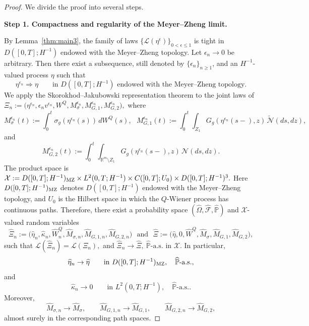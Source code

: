 \documentclass[11pt]{article}
\theoremstyle{plain}
\numberwithin{equation}{section}
\begin{document}
 
\begin{proof}
We divide the proof into several steps.



\medskip
\noindent\textbf{Step 1. Compactness and regularity of the Meyer--Zheng limit.}

By Lemma~\ref{thm:main3}, the family of laws \(\{\mathcal L(\eta^\epsilon)\}_{0<\epsilon\le1}\)
is tight in \(D([0,T];H^{-1})\) endowed with the Meyer--Zheng topology. Let \(\epsilon_n\to0\) be arbitrary. Then there exist a subsequence, still
denoted by \(\{\epsilon_n\}_{n\ge1}\), and an \(H^{-1}\)-valued process \(\eta\) such that
\[
\eta^{\epsilon_n}\Longrightarrow \eta\qquad \text{in }D([0,T];H^{-1})\text{ endowed with the Meyer--Zheng topology}.
\]
We apply the Skorokhod--Jakubowski representation theorem to the joint laws
of
\(\Xi_n:=\Big(\eta^{\epsilon_n},\epsilon_n v^{\epsilon_n},W^Q, M_{\sigma}^{\epsilon_n}, M_{G,1}^{\epsilon_n}, M_{G,2}^{\epsilon_n} \Big),\)
where
\[
M_{\sigma}^{\epsilon_n}(t) :=
\int_0^t \sigma_g(\eta^{\epsilon_n}(s))\,dW^Q(s),~~~M_{G,1}^{\epsilon_n}(t):=\int_0^t\int_{Z_1}G_g(\eta^{\epsilon_n}(s-),z)\,\tilde{\mathcal N}(ds,dz),
\]
and
\[
M_{G,2}^{\epsilon_n}(t):=\int_0^t\int_{\mathbb R^m\setminus Z_1}G_g(\eta^{\epsilon_n}(s-),z)\,{\mathcal N}(ds,dz).
\]
The product space is \(\mathcal X:=D([0,T];H^{-1})_{\rm MZ}\times L^2(0,T;H^{-1})\times C([0,T];U_0)\times D([0,T];H^{-1})^3 .\)
Here \(D([0,T];H^{-1})_{\rm MZ}\) denotes \(D([0,T];H^{-1})\) endowed with the Meyer--Zheng topology, and \(U_0\)
is the Hilbert space in which the \(Q\)-Wiener process has continuous paths.
Therefore, there exist a probability space \((\widehat\Omega,\widehat{\mathcal F},\widehat{\mathbb P})\)
and \(\mathcal X\)-valued random variables
\[
\widehat\Xi_n := \Big(\widehat\eta_n,\widehat\kappa_n,\widehat W_n^Q,\widehat M_{\sigma,n},\widehat M_{G,1,n},\widehat M_{G,2,n}\Big)
~~~\text{and}~~~\widehat\Xi:=\Big(\widehat\eta,0,\widehat W^Q,\widehat M_{\sigma},\widehat M_{G,1},\widehat M_{G,2}\Big),
\]
such that \(\mathcal L(\widehat\Xi_n)=\mathcal L(\Xi_n),\) and \(\widehat\Xi_n\to\widehat\Xi,~\widehat{\mathbb P}\text{-a.s. in }\mathcal X .\)
In particular,
\[
\widehat\eta_n\to\widehat\eta\qquad\text{in }D([0,T];H^{-1})_{\rm MZ},\quad\widehat{\mathbb P}\text{-a.s.},
\]
and
\[
\widehat\kappa_n\to0\qquad\text{in }L^2(0,T;H^{-1}),\quad\widehat{\mathbb P}\text{-a.s.}.
\]
Moreover,
\[
\widehat M_{\sigma,n}\to\widehat M_\sigma,\qquad\widehat  M_{G,1,n}\to\widehat M_{G,1},\qquad \widehat M_{G,2,n}\to\widehat M_{G,2},
\]
almost surely in the corresponding path spaces.

\end{proof}
\end{document}
